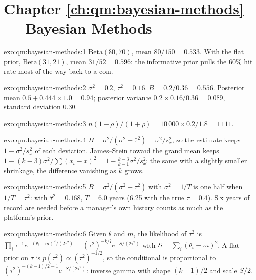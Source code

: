 \section*{Chapter \ref{ch:qm:bayesian-methods} --- Bayesian Methods}

\begin{solution}{exo:qm:bayesian-methods:1}
$\mathrm{Beta}(80, 70)$, mean $80/150 = 0.533$. With the flat prior, $\mathrm{Beta}(31, 21)$, mean $31/52 = 0.596$: the informative prior
pulls the 60\% hit rate most of the way back to a coin.
\end{solution}

\begin{solution}{exo:qm:bayesian-methods:2}
$\sigma^2 = 0.2$, $\tau^2 = 0.16$, $B = 0.2/0.36 = 0.556$. Posterior mean $0.5 + 0.444 \times 1.0 = 0.94$; posterior variance $0.2 \times
0.16/0.36 = 0.089$, standard deviation 0.30.
\end{solution}

\begin{solution}{exo:qm:bayesian-methods:3}
$n(1 - \rho)/(1 + \rho) = 10\,000 \times 0.2/1.8 = 1\,111$.
\end{solution}

\begin{solution}{exo:qm:bayesian-methods:4}
$B = \sigma^2/(\sigma^2 + \hat\tau^2) = \sigma^2/s_x^2$, so the estimate keeps $1 - \sigma^2/s_x^2$ of each deviation. James--Stein toward the
grand mean keeps $1 - (k - 3)\sigma^2/\sum(x_i - \bar x)^2 = 1 - \frac{k-3}{k-1}\sigma^2/s_x^2$: the same  with a slightly smaller
shrinkage, the difference vanishing as $k$ grows.
\end{solution}

\begin{solution}{exo:qm:bayesian-methods:5}
$B = \sigma^2/(\sigma^2 + \tau^2)$ with $\sigma^2 = 1/T$ is one half when $1/T = \tau^2$: with $\hat\tau^2 = 0.168$, $T = 6.0$ years (6.25 with the
true $\tau = 0.4$). Six years of record are needed before a manager's own history counts as much as the platform's prior.
\end{solution}

\begin{solution}{exo:qm:bayesian-methods:6}
Given $\theta$ and $m$, the likelihood of $\tau^2$ is $\prod_i\tau^{-1}e^{-(\theta_i - m)^2/(2\tau^2)} = (\tau^2)^{-k/2}e^{-S/(2\tau^2)}$ with $S =
\sum_i(\theta_i - m)^2$. A flat prior on $\tau$ is $p(\tau^2) \propto (\tau^2)^{-1/2}$, so the conditional is proportional to
$(\tau^2)^{-(k-1)/2 - 1}e^{-S/(2\tau^2)}$: inverse gamma with shape $(k - 1)/2$ and scale $S/2$.
\end{solution}

